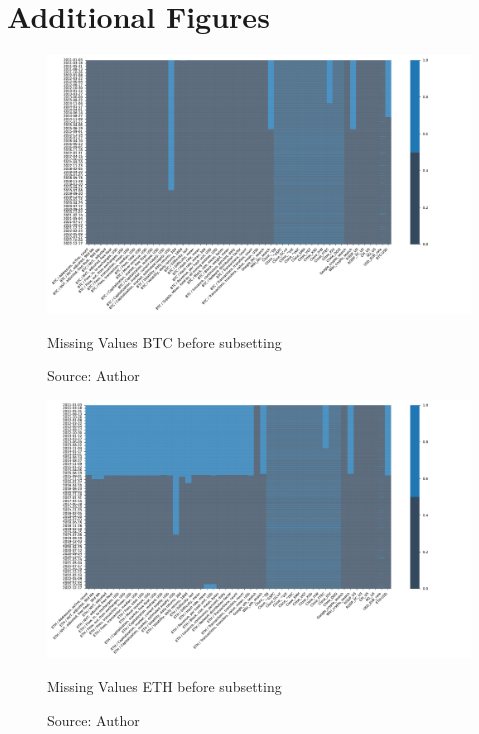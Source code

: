 \chapter{Additional Figures}

\begin{figure}[!htbp]
    \centering
    \includegraphics[width=1.1\linewidth,height=0.9\textheight,keepaspectratio]{Figures/BTC_missing_1.pdf}
    \caption{Missing Values BTC before subsetting}
    \label{fig:btc_missing_1}
    \caption*{Source: Author}
\end{figure}

\begin{figure}[!htbp]
    \centering
    \includegraphics[width=1.1\linewidth,height=0.9\textheight,keepaspectratio]{Figures/ETH_missing_1.pdf}
    \caption{Missing Values ETH before subsetting}
    \label{fig:eth_missing_1}
    \caption*{Source: Author}
\end{figure}

